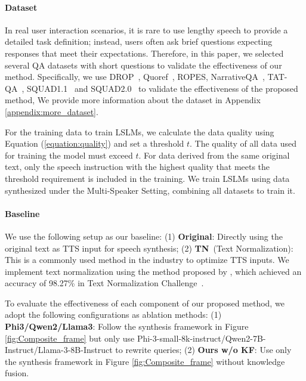 \documentclass[11pt]{article}
\begin{document}
	\paragraph{Dataset}
	In real user interaction scenarios, it is rare to use lengthy speech to provide a detailed task definition; instead, users often ask brief questions expecting responses that meet their expectations. Therefore, in this paper, we selected several QA datasets with short questions to validate the effectiveness of our method. Specifically, we use DROP~\citep{dua2019dropreadingcomprehensionbenchmark}, Quoref~\citep{dasigi-etal-2019-quoref}, ROPES\citep{lin2019reasoningparagrapheffectssituations}, NarrativeQA~\citep{kočiský2017narrativeqareadingcomprehensionchallenge}, TAT-QA~\citep{zhu2021tatqaquestionansweringbenchmark}, SQUAD1.1~\citep{rajpurkar2016squad100000questionsmachine} and SQUAD2.0~\citep{rajpurkar2018knowdontknowunanswerable} to validate the effectiveness of the proposed method, We provide more information about the dataset in Appendix \ref{appendix:more_dataset}.
	

	For the training data to train LSLMs, we calculate the data quality using Equation (\ref{equation:quality}) and set a threshold  $t$. The quality of all data used for training the model must exceed $t$. For data derived from the same original text, only the speech instruction with the highest quality that meets the threshold requirement is included in the training. We train LSLMs using data synthesized under the Multi-Speaker Setting, combining all datasets to train it.


	\paragraph{Baseline}

	We use the following setup as our baseline: (1) \textbf{Original}: Directly using the original text as TTS input for speech synthesis; (2) \textbf{TN}~(Text Normalization): This is a commonly used method in the industry to optimize TTS inputs. We implement text normalization using the method proposed by \citep{piAI_text_normalization}, which achieved an accuracy of 98.27\% in Text Normalization Challenge~\citep{text-normalization-challenge-english-language}.

	

	To evaluate the effectiveness of each component of our proposed method, we adopt the following configurations as ablation methods:	(1) \textbf{Phi3/Qwen2/Llama3}: Follow the synthesis framework in Figure \ref{fig:Composite_frame} but only use Phi-3-small-8k-instruct/Qwen2-7B-Instruct/Llama-3-8B-Instruct to rewrite queries;	(2) \textbf{Ours w/o KF}: Use only the synthesis framework in Figure \ref{fig:Composite_frame} without knowledge fusion.
\end{document}
